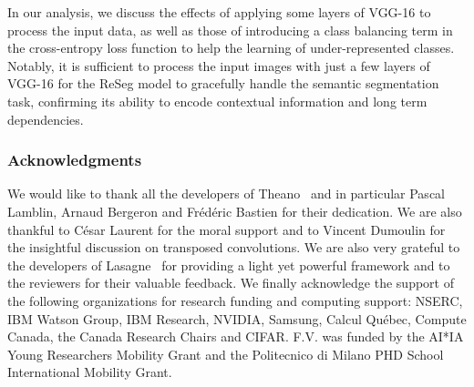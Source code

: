\documentclass[times,art10,twocolumn,latex8]{article}
\begin{document}
In our analysis, we discuss the effects of applying some layers of VGG-16 to
process the input data, as well as those of introducing a class balancing
term in the cross-entropy loss function to help the learning of
under-represented classes.
Notably, it is sufficient to process the input images with just a few layers of
VGG-16 for the ReSeg model to gracefully handle the semantic segmentation task, confirming
its ability to encode contextual information and long term dependencies.

\subsubsection*{Acknowledgments}
We would like to thank all the developers of
Theano~\cite{Bergstra2010,Bastien2012} and in particular Pascal Lamblin, Arnaud
Bergeron and Frédéric Bastien for their dedication. We are also thankful to
César Laurent for the moral support and to Vincent Dumoulin for the insightful
discussion on transposed convolutions. We are also very grateful to the
developers of Lasagne~\cite{Lasagne} for providing a light yet powerful
framework and to the reviewers for their valuable feedback. We finally
acknowledge the support of the following organizations for research funding and
computing support: NSERC, IBM Watson Group, IBM Research, NVIDIA, Samsung,
Calcul Qu\'{e}bec, Compute Canada, the Canada Research Chairs and CIFAR. F.V.
was funded by the AI*IA Young Researchers Mobility Grant and the Politecnico di
Milano PHD School International Mobility
Grant.

{\small


}
\end{document}

